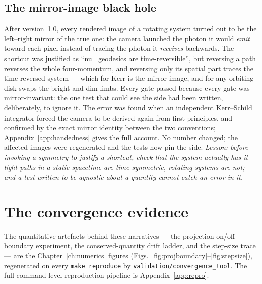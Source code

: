 \subsection{The mirror-image black hole}
\label{sec:mirrorbug}
After version~1.0, every rendered image of a rotating system turned
out to be the left--right mirror of the true one: the camera launched
the photon it would \emph{emit} toward each pixel instead of tracing
the photon it \emph{receives} backwards. The shortcut was justified as
``null geodesics are time-reversible'', but reversing a path reverses
the whole four-momentum, and reversing only its spatial part traces the
time-reversed system — which for Kerr is the mirror image, and for any
orbiting disk swaps the bright and dim limbs. Every gate passed because
every gate was mirror-invariant: the one test that could see the side
had been written, deliberately, to ignore it. The error was found when
an independent Kerr--Schild integrator forced the camera to be derived
again from first principles, and confirmed by the exact mirror identity
between the two conventions; Appendix~\ref{app:handedness} gives the
full account. No number changed; the affected images were regenerated
and the tests now pin the side. \emph{Lesson: before invoking a
symmetry to justify a shortcut, check that the system actually has it —
light paths in a static spacetime are time-symmetric, rotating systems
are not; and a test written to be agnostic about a quantity cannot
catch an error in it.}

\section{The convergence evidence}

The quantitative artefacts behind these narratives — the projection
on/off boundary experiment, the conserved-quantity drift ladder, and the
step-size trace — are the Chapter~\ref{ch:numerics} figures
(Figs.~\ref{fig:projboundary}--\ref{fig:stepsize}), regenerated on
every \texttt{make reproduce} by \texttt{validation/convergence\_tool}.
The full command-level reproduction pipeline is Appendix~\ref{app:repro}.
